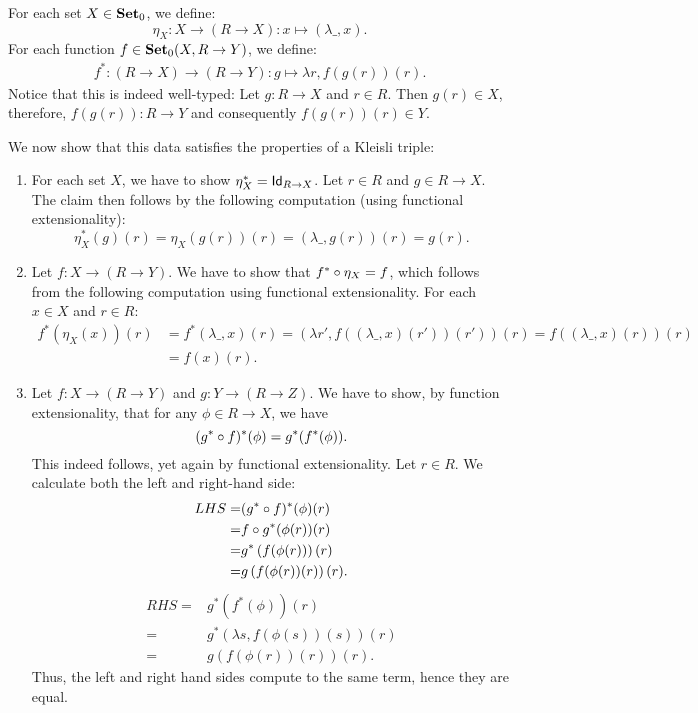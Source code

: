 \begin{solution}
\begin{enumerate}
\end{enumerate}
\end{solution}

\begin{solution}\label{sol:kleisli_triple_familiesofelements}
For each set $X\in\Ob \SET$, we define:
\[
\eta_X : X \to (R \to X) : x\mapsto (\lambda \_, x).
\]
For each function $f\in\CHom{\Ob \SET}{X}{R\to Y}$, we define:
\begin{align*}
f^{*} : (R\to X) \to (R\to Y) : g \mapsto \lambda r, f(g(r))(r).
\end{align*}
Notice that this is indeed well-typed: Let $g : R\to X$ and $r\in R$. Then $g(r)\in X$, therefore, $f(g(r)) : R\to Y$ and consequently $f(g(r))(r)\in Y$.

We now show that this data satisfies the properties of a Kleisli triple:
\begin{enumerate}
\item For each set $X$, we have to show $\eta_X^{*} = \Id[R\to X]$. Let $r\in R$ and $g\in R\to X$. The claim then follows by the following computation (using functional extensionality):
\[
\eta_X^{*}(g)(r) = \eta_X(g(r))(r) = (\lambda \_, g(r))(r) = g(r).
\]
\item Let $f: X\to (R\to Y)$. We have to show that $\co{\eta_X}{f^{*}} = f$, which follows from the following computation using functional extensionality. For each $x\in X$ and $r\in R$:
\begin{align*}
	f^{*}(\eta_X(x))(r) & = f^{*}(\lambda \_,x)(r) = \left(\lambda r', f((\lambda \_, x)(r'))(r')\right)(r) = f((\lambda \_,x)(r))(r) \\
	& = f(x)(r).
\end{align*}

\item Let $f: X\to (R\to Y)$ and $g: Y\to (R\to Z)$. We have to show, by function extensionality, that for any $\phi\in R\to X$, we have 
\[
(\co{f}{g^{*}})^{*}(\phi) = g^{*}(f^{*}(\phi)).
\]
This indeed follows, yet again by functional extensionality. Let $r\in R$. We calculate both the left and right-hand side:
\begin{align*}
LHS =& (\co{f}{g^{*}})^{*}(\phi)(r)\\ 
	=& \co{g^{*}}{f}(\phi(r))(r)\\ 
	=& g^{*}\left(f(\phi(r))\right)(r)\\ 
	=& g\left(f(\phi(r))(r)\right)(r).
\end{align*}
\begin{align*}
RHS =& g^{*}(f^{*}(\phi))(r)\\ 
	=& g^{*}\left(\lambda s, f(\phi(s))(s)\right)(r)\\
	=& g( f(\phi(r))(r) )(r).
\end{align*}
Thus, the left and right hand sides compute to the same term, hence they are equal.
\end{enumerate}
\end{solution}



